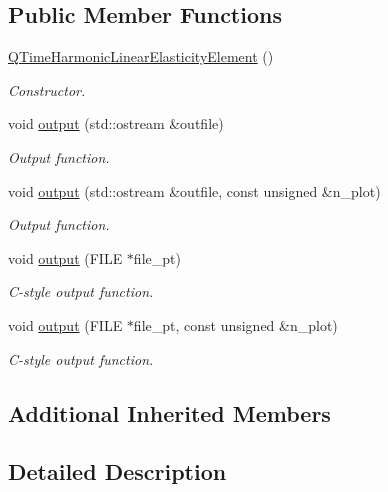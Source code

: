 \subsection*{Public Member Functions}
\begin{DoxyCompactItemize}
\item 
\hyperlink{classoomph_1_1QTimeHarmonicLinearElasticityElement_a8c5f0a70c86dc31824f29fd90616c4c2}{Q\+Time\+Harmonic\+Linear\+Elasticity\+Element} ()
\begin{DoxyCompactList}\small\item\em Constructor. \end{DoxyCompactList}\item 
void \hyperlink{classoomph_1_1QTimeHarmonicLinearElasticityElement_a4d142935a8302780cbfe8fdcd26d4358}{output} (std\+::ostream \&outfile)
\begin{DoxyCompactList}\small\item\em Output function. \end{DoxyCompactList}\item 
void \hyperlink{classoomph_1_1QTimeHarmonicLinearElasticityElement_a7429278e0a38d0b934b574f421ea54c3}{output} (std\+::ostream \&outfile, const unsigned \&n\+\_\+plot)
\begin{DoxyCompactList}\small\item\em Output function. \end{DoxyCompactList}\item 
void \hyperlink{classoomph_1_1QTimeHarmonicLinearElasticityElement_a1a8ff0960bcfd07a8c24ca74309f6594}{output} (F\+I\+LE $\ast$file\+\_\+pt)
\begin{DoxyCompactList}\small\item\em C-\/style output function. \end{DoxyCompactList}\item 
void \hyperlink{classoomph_1_1QTimeHarmonicLinearElasticityElement_a4d1ae51e639b76e695e2fc5a84b385ef}{output} (F\+I\+LE $\ast$file\+\_\+pt, const unsigned \&n\+\_\+plot)
\begin{DoxyCompactList}\small\item\em C-\/style output function. \end{DoxyCompactList}\end{DoxyCompactItemize}
\subsection*{Additional Inherited Members}


\subsection{Detailed Description}
